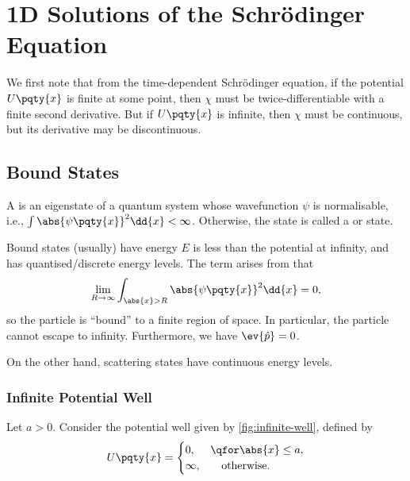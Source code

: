 \section{1D Solutions of the Schr\"{o}dinger Equation}

We first note that from the time-dependent Schr\"{o}dinger equation, if the potential \(U\pqty{x}\) is finite at some point, then \(\chi\) must be twice-differentiable with a finite second derivative. But if \(U\pqty{x}\) is infinite, then \(\chi\) must be continuous, but its derivative may be discontinuous.

\subsection{Bound States}

\begin{definition}
    A  is an eigenstate of a quantum system whose wavefunction \(\psi\) is normalisable, i.e., \(\int \abs{\psi\pqty{x}}^2 \dd{x} < \infty\). Otherwise, the state is called a  or  state.
\end{definition}

Bound states (usually) have energy \(E\) is less than the potential at infinity, and has quantised/discrete energy levels. The term arises from that
\begin{equation}
    \lim_{R \to \infty} \int_{\abs{x} > R} \abs{\psi\pqty{x}}^2 \dd{x} = 0,
\end{equation}
so the particle is ``bound'' to a finite region of space. In particular, the particle cannot escape to infinity. Furthermore, we have \(\ev{\hat{p}} = 0\).

On the other hand, scattering states have continuous energy levels.

\subsubsection{Infinite Potential Well}

Let \(a > 0\). Consider the potential well given by \autoref{fig:infinite-well}, defined by
\begin{equation}
    U\pqty{x} = \begin{cases}
    0, & \qfor \abs{x} \leq a, \\
    \infty, & \quad \text{otherwise}.
    \end{cases}
\end{equation}

